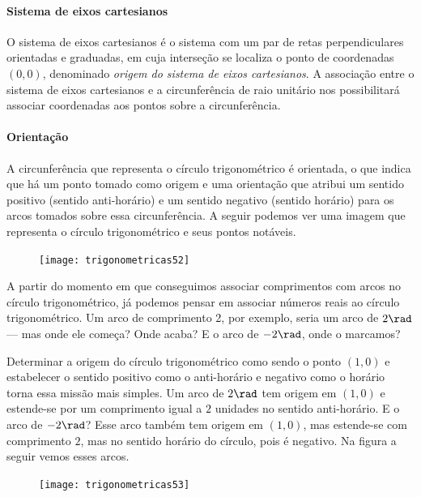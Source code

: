\paragraph{Sistema de eixos cartesianos}

O sistema de eixos cartesianos é o sistema com um par de retas perpendiculares orientadas e graduadas, em cuja interseção se localiza o ponto de coordenadas $(0,0)$, denominado \textit{origem do sistema de eixos cartesianos}. A associação entre o sistema de eixos cartesianos e a circunferência de raio unitário nos possibilitará associar coordenadas aos pontos sobre a circunferência.

\paragraph{Orientação}

A circunferência que representa o círculo trigonométrico é orientada, o que indica que há um ponto tomado como origem e uma orientação que atribui um sentido positivo (sentido anti-horário) e um sentido negativo (sentido horário) para os arcos tomados sobre essa circunferência. A seguir podemos ver uma imagem que representa o círculo trigonométrico e seus pontos notáveis.

\begin{figure}[H]
\centering

\texttt{[image: trigonometricas52]}
\end{figure}

A partir do momento em que conseguimos associar comprimentos com arcos no círculo trigonométrico, já podemos pensar em associar números reais ao círculo trigonométrico. Um arco de comprimento 2, por exemplo, seria um arco de $2 \rad$ --- mas onde ele começa? Onde acaba? E o arco de $-2\rad$, onde o marcamos?

Determinar a origem do círculo trigonométrico como sendo o ponto $(1,0)$ e estabelecer o sentido positivo como o anti-horário e negativo como o horário torna essa missão mais simples. Um arco de $2\rad$ tem origem em $(1,0)$ e estende-se por um comprimento igual a $2$ unidades no sentido anti-horário. E o arco de $-2 \rad$? Esse arco também tem origem em $(1,0)$, mas estende-se com comprimento $2$, mas no sentido horário do círculo, pois é negativo. Na figura a seguir vemos esses arcos.

\begin{figure}[H]
\centering

\texttt{[image: trigonometricas53]}
\end{figure}

